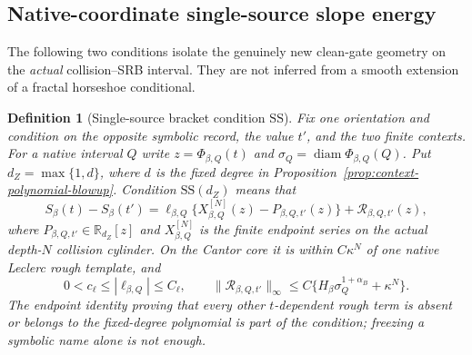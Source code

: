 \documentclass[11pt]{article}
\newtheorem{definition}[theorem]{Definition}
\begin{document}
\subsection{Native-coordinate single-source slope energy}

The following two conditions isolate the genuinely new clean-gate geometry
on the \emph{actual} collision--SRB interval.  They are not inferred from a
smooth extension of a fractal horseshoe conditional.

\begin{definition}[Single-source bracket condition $\mathrm{SS}$]
\label{def:single-source-condition}
Fix one orientation and condition on the opposite symbolic record, the value
$t'$, and the two finite contexts.  For a native interval $Q$ write
$z=\Phi_{\beta,Q}(t)$ and
$\sigma_Q=\operatorname{diam}\Phi_{\beta,Q}(Q)$.  Put
$d_Z=\max\{1,d\}$, where $d$ is
the fixed degree in Proposition~\ref{prop:context-polynomial-blowup}.
Condition $\mathrm{SS}(d_Z)$ means that
\begin{equation}
\label{eq:exact-reduced-slope}
 S_\beta(t)-S_\beta(t')
 =\ell_{\beta,Q}\{X^{[N]}_{\beta,Q}(z)-P_{\beta,Q,t'}(z)\}
  +\mathcal R_{\beta,Q,t'}(z),
\end{equation}
where $P_{\beta,Q,t'}\in\mathbb R_{d_Z}[z]$ and
$X^{[N]}_{\beta,Q}$ is the finite endpoint series on the actual depth-$N$
collision cylinder.  On the Cantor core it is within $C\kappa^N$ of one
native Leclerc rough template, and
\begin{equation}
\label{eq:single-source-coefficient}
 0<c_\ell\le|\ell_{\beta,Q}|\le C_\ell,
 \qquad
 \|\mathcal R_{\beta,Q,t'}\|_\infty
 \le C\{H_\beta\sigma_Q^{1+\alpha_B}+\kappa^N\}.
\end{equation}
The endpoint identity proving that every other $t$-dependent rough term is
absent or belongs to the fixed-degree polynomial is part of the condition;
freezing a symbolic name alone is not enough.
\end{definition}
\end{document}

